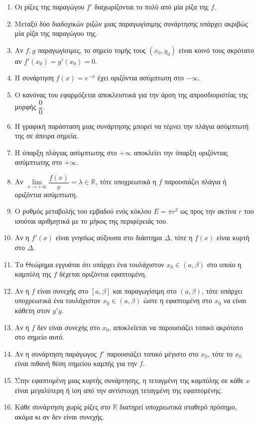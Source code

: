 \begin{enumerate}[label=\textbf{2.\arabic*.}]
    \item Οι ρίζες της παραγώγου $f'$ διαχωρίζονται το πολύ από μία ρίζα της $f$.
    \item Μεταξύ δύο διαδοχικών ριζών μιας παραγωγίσιμης συνάρτησης υπάρχει ακριβώς μία ρίζα της παραγώγου της.
    \item Αν $f, g$ παραγωγίσιμες, το σημείο τομής τους $(x_0, y_0)$ είναι κοινό τους ακρότατο αν $f'(x_0) = g'(x_0) = 0$.
    \item Η συνάρτηση $f(x) = e^{-x}$ έχει οριζόντια ασύμπτωτη στο $-\infty$.
    \item Ο κανόνας του  εφαρμόζεται αποκλειστικά για την άρση της απροσδιοριστίας της μορφής $\dfrac{0}{0}$.
    \item Η γραφική παράσταση μιας συνάρτησης μπορεί να τέμνει την πλάγια ασύμπτωτή της σε άπειρα σημεία.
    \item Η ύπαρξη πλάγιας ασύμπτωτης στο $+\infty$ αποκλείει την ύπαρξη οριζόντιας ασύμπτωτης στο $+\infty$.
    \item Αν $\lim\limits_{x \to +\infty} \dfrac{f(x)}{x} = \lambda \in \mathbb{R}$, τότε υποχρεωτικά η $f$ παρουσιάζει πλάγια ή οριζόντια ασύμπτωτη.
    \item Ο ρυθμός μεταβολής του εμβαδού ενός κύκλου $E = \pi r^2$ ως προς την ακτίνα $r$ του ισούται αριθμητικά με το μήκος της περιφέρειάς του.
    \item Αν η $f'(x)$ είναι γνησίως αύξουσα στο διάστημα $\Delta$, τότε η $f(x)$ είναι κυρτή στο $\Delta$.
    \item Το Θεώρημα  εγγυάται ότι υπάρχει ένα τουλάχιστον $x_0 \in (a,\beta)$ στο οποίο η καμπύλη της $f$ δέχεται οριζόντια εφαπτομένη.
    \item Αν η $f$ είναι συνεχής στο $[a,\beta]$ και παραγωγίσιμη στο $(a,\beta)$, τότε υπάρχει υποχρεωτικά ένα τουλάχιστον $x_0 \in (a,\beta)$ ώστε η εφαπτομένη στο $x_0$ να είναι κάθετη στον $y'y$.
    \item Αν η $f$ δεν είναι συνεχής στο $x_0$, αποκλείεται να παρουσιάζει τοπικό ακρότατο στο σημείο αυτό.
    \item Αν η συνάρτηση παράγωγος $f'$ παρουσιάζει τοπικό μέγιστο στο $x_0$, τότε το $x_0$ είναι πιθανή θέση σημείου καμπής για την $f$.
    \item Στην εφαπτομένη μιας κυρτής συνάρτησης, η τεταγμένη της καμπύλης σε κάθε $x$ είναι μεγαλύτερη ή ίση από την αντίστοιχη τεταγμένη της εφαπτομένης.
    \item Κάθε συνάρτηση χωρίς ρίζες στο $\mathbb{R}$ διατηρεί υποχρεωτικά σταθερό πρόσημο, ακόμα κι αν δεν είναι συνεχής.
\end{enumerate}

